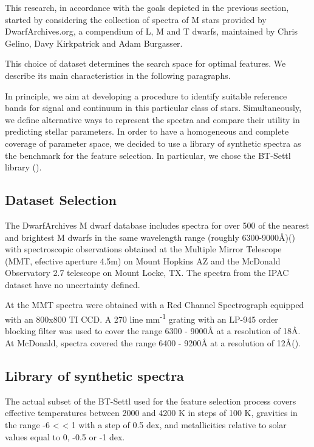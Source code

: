 This research, in accordance with the goals depicted in the previous
  section, started by considering the collection of spectra of M stars
  provided by DwarfArchives.org, a compendium of L, M and T dwarfs,
  maintained by Chris Gelino, Davy Kirkpatrick and Adam Burgasser.

This choice of dataset determines the search space for optimal
features. We describe its main characteristics in the following
paragraphs.

In principle, we aim at developing a procedure to identify suitable
reference bands for signal and continuum in this particular class of
stars. Simultaneously, we define alternative ways to represent the
spectra and compare their utility in predicting stellar parameters. In
order to have a homogeneous and complete coverage of parameter space,
we decided to use a library of synthetic spectra as the benchmark for
the feature selection. In particular, we chose the BT-Settl library
(\cite{2013MSAIS..24..128A}). 

\subsection{Dataset Selection}
\label{subsec:DS}
 The DwarfArchives M dwarf database includes spectra for over 500 of
  the nearest and brightest M dwarfs in the same wavelength range
  (roughly 6300-9000{\AA})(\cite{Kirkpatrick:2002eh}) with
  spectroscopic observations obtained at the Multiple Mirror Telescope
  (MMT, efective aperture 4.5m) on Mount Hopkins AZ and the McDonald
  Observatory 2.7 telescope on Mount Locke, TX. The spectra from the
  IPAC dataset have no uncertainty defined.

 At the MMT spectra were obtained with a Red Channel Spectrograph
  equipped with an 800x800 TI CCD. A 270 line mm\textsuperscript{-1}
  grating with an LP-945 order blocking filter was used to cover the
  range 6300 - 9000{\AA} at a resolution of 18{\AA}. At McDonald,
  spectra covered the range 6400 - 9200{\AA} at a resolution of
  12{\AA}(\cite{1994AJ....108.1437H}).

\subsection {Library of synthetic spectra}

\label{subsec:RTL}

The actual subset of the BT-Settl used for the feature selection
process covers effective temperatures between 2000 and 4200 K in steps
of 100 K, gravities in the range -6 < \logg < 1 with a step of 0.5
dex, and metallicities relative to solar values equal to 0, -0.5 or -1
dex.

